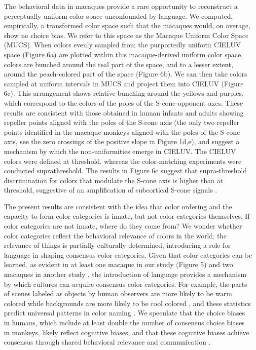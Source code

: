 The behavioral data in macaques provide a rare opportunity to reconstruct a perceptually uniform color space unconfounded by language.
We computed, empirically, a transformed color space such that the macaques would, on average, show no choice bias. 
We refer to this space as the Macaque Uniform Color Space (MUCS). 
When colors evenly sampled from the purportedly uniform CIELUV space (Figure 6a) are plotted within this macaque-derived uniform color space, colors are bunched around the teal part of the space, and to a lesser extent, around the peach-colored part of the space (Figure 6b). 
We can then take colors sampled at uniform intervals in MUCS and project them into CIELUV (Figure 6c). This arrangement shows relative bunching around the yellows and purples, which correspond to the colors of the poles of the S-cone-opponent axes. 
These results are consistent with those obtained in human infants \citep{skelton_biological_2017} and adults \citep{bae_why_2015,panichello_error-correcting_2019} showing repeller points aligned with the poles of the S-cone axis (the only two repeller points identified in the macaque monkeys aligned with the poles of the S-cone axis, see the zero crossings of the positive slope in Figure 1d,e), and suggest a mechanism by which the non-uniformities emerge in CIELUV. 
The CIELUV colors were defined at threshold, whereas the color-matching experiments were conducted suprathreshold. 
The results in Figure 6c suggest that supra-threshold discrimination for colors that modulate the S-cone axis is higher than at threshold, suggestive of an amplification of subcortical S-cone signals \citep{RN655}. 

The present results are consistent with the idea that color ordering and the capacity to form color categories is innate, but not color categories themselves. 
If color categories are not innate, where do they come from? We wonder whether color categories reflect the behavioral relevance of colors in the world; the relevance of things is partially culturally determined, introducing a role for language in shaping consensus color categories. 
Given that color categories can be learned, as evident in at least one macaque in our study (Figure 5) and two macaques in another study \citep{panichello_error-correcting_2019}, the introduction of language provides a mechanism by which cultures can acquire consensus color categories. 
For example, the parts of scenes labeled as objects by human observers are more likely to be warm colored while backgrounds are more likely to be cool colored \citep{rosenthal_color_2018}, and these statistics predict universal patterns in color naming \citep{gibson_color_2017}. 
We speculate that the choice biases in humans, which include at least double the number of consensus choice biases in monkeys, likely reflect cognitive biases, and that these cognitive biases achieve consensus through shared behavioral relevance and communication \citep{RN18511,RN18514,RN18602}. 
